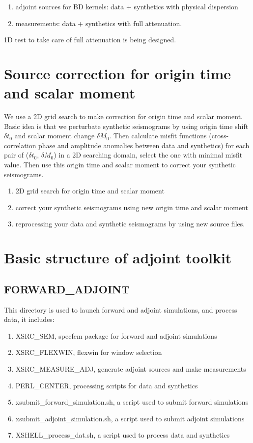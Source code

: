 \documentclass[11pt]{article}
\begin{document}
\begin{enumerate}
\item adjoint sources for BD kernels: data + synthetics with physical dispersion
\item measurements: data + synthetics with full attenuation.
\end{enumerate}

1D test to take care of full attenuation is being designed.

\section{Source correction for origin time and scalar moment}
We use a 2D grid search to make correction for origin time and scalar moment.
Basic idea is that we perturbate synthetic seismograms by using origin time shift $\delta t_0$ and scalar moment change $\delta M_0$.
Then calculate misfit functions (cross-correlation phase and amplitude anomalies between data and synthetics) for each pair of ($\delta t_0$, $\delta M_0$) in a 2D searching domain, select the one with minimal misfit value. Then use this origin time and scalar moment to correct
your synthetic seismograms.

\begin{enumerate}
\item 2D grid search for origin time and scalar moment
\item correct your synthetic seismograms using new origin time and scalar moment
\item reprocessing your data and synthetic seismograms by using new source files.
\end{enumerate}

\section{Basic structure of adjoint toolkit}

\subsection{FORWARD\_ADJOINT}
This directory is used to launch forward and adjoint simulations, and process data, it includes:
\begin{enumerate}
\item XSRC\_SEM, specfem package for forward and adjoint simulations
\item XSRC\_FLEXWIN, flexwin for window selection
\item XSRC\_MEASURE\_ADJ, generate adjoint sources and make measurements
\item PERL\_CENTER, processing scripts for data and synthetics
\item xsubmit\_forward\_simulation.sh, a script used to submit forward simulations
\item xsubmit\_adjoint\_simulation.sh, a script used to submit adjoint simulations
\item XSHELL\_process\_dat.sh, a script used to process data and synthetics
\end{enumerate}
\end{document}
